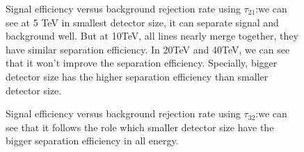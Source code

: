 \begin{figure}
\begin{center}
\end{center}
\caption{Signal efficiency versus background rejection rate using $\tau_{21}$:we can see at 5 TeV in smallest detector size, it can separate signal and background well. But at 10TeV, all lines nearly merge together, they have similar separation efficiency. In 20TeV and 40TeV, we can see that it won't improve the separation efficiency. Specially, bigger detector size has the higher separation efficiency than smaller detector size.}
\label{fig:cluster_tau21}
\end{figure}


\begin{figure}
\begin{center}
\end{center}
\caption{Signal efficiency versus background rejection rate using $\tau_{32}$:we can see that it follows the role which smaller detector size have the bigger separation efficiency in all energy.}
\label{fig:cluster_tau32}
\end{figure}

